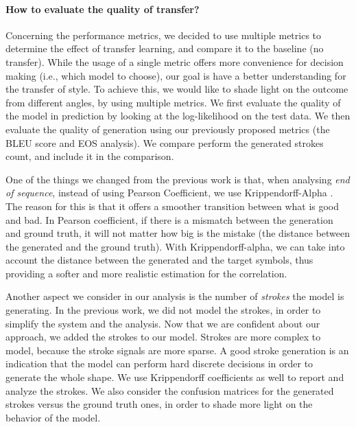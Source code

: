   \paragraph{How to evaluate the quality of transfer?} Concerning the performance metrics, we decided to use multiple metrics to determine the effect of transfer learning, and compare it to the baseline (no transfer). While the usage of a single metric offers more convenience for decision making (i.e., which model to choose), our goal is have a better understanding for the transfer of style. To achieve this, we would like to shade light on the outcome from different angles, by using multiple metrics. We first evaluate the quality of the model in prediction by looking at the log-likelihood on the test data. We then evaluate the quality of generation using our previously proposed metrics (the BLEU score and EOS analysis). We compare perform the generated strokes count, and include it in the comparison.

  \par One of the things we changed from the previous work is that, when analysing \textit{end of sequence}, instead of using Pearson Coefficient, we use Krippendorff-Alpha \citep{krippendorff2011computing}. The reason for this is that it offers a smoother transition between what is good and bad. In Pearson coefficient, if there is a mismatch between the generation and ground truth, it will not matter how big is the mistake (the distance between the generated and the ground truth). With Krippendorff-alpha, we can take into account the distance between the generated and the target symbols, thus providing a softer and more realistic estimation for the correlation.

  \par Another aspect we consider in our analysis is the number of \textit{strokes} the model is generating. In the previous work, we did not model the strokes, in order to simplify the system and the analysis. Now that we are confident about our approach, we added the strokes to our model. Strokes are more complex to model, because the stroke signals are more sparse. A good stroke generation is an indication that the model can perform hard discrete decisions in order to generate the whole shape. We use Krippendorff coefficients as well to report and analyze the strokes. We also consider the confusion matrices for the generated strokes versus the ground truth ones, in order to shade more light on the behavior of the model.

